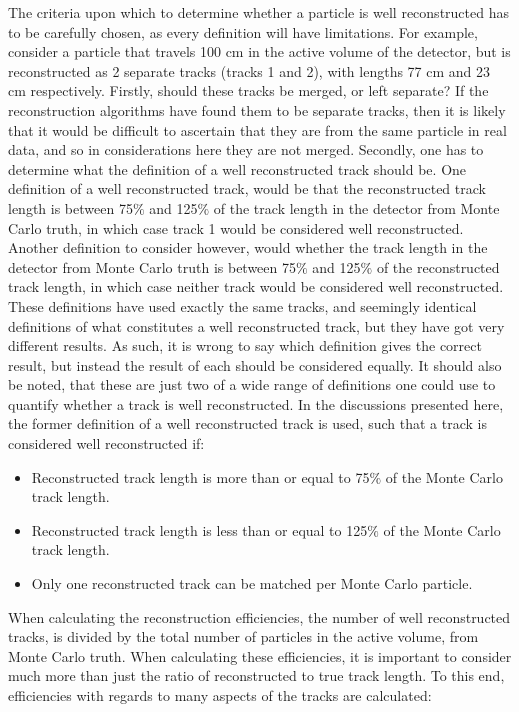 The criteria upon which to determine whether a particle is well reconstructed has to be carefully chosen, as every definition will have limitations. For example, consider a particle that travels 100 cm in the active volume of the detector, but is reconstructed as 2 separate tracks (tracks 1 and 2), with lengths 77 cm and 23 cm respectively. Firstly, should these tracks be merged, or left separate? If the reconstruction algorithms have found them to be separate tracks, then it is likely that it would be difficult to ascertain that they are from the same particle in real data, and so in considerations here they are not merged. Secondly, one has to determine what the definition of a well reconstructed track should be. One definition of a well reconstructed track, would be that the reconstructed track length is between 75$\%$ and 125$\%$ of the track length in the detector from Monte Carlo truth, in which case track 1 would be considered well reconstructed. Another definition to consider however, would whether the track length in the detector from Monte Carlo truth is between 75$\%$ and 125$\%$ of the reconstructed track length, in which case neither track would be considered well reconstructed. These definitions have used exactly the same tracks, and seemingly identical definitions of what constitutes a well reconstructed track, but they have got very different results. As such, it is wrong to say which definition gives the correct result, but instead the result of each should be considered equally. It should also be noted, that these are just two of a wide range of definitions one could use to quantify whether a track is well reconstructed. In the discussions presented here, the former definition of a well reconstructed track is used, such that a track is considered well reconstructed if:
\begin{itemize}
\item Reconstructed track length is more than or equal to 75$\%$ of the Monte Carlo track length.
\item Reconstructed track length is less than or equal to 125$\%$ of the Monte Carlo track length.
\item Only one reconstructed track can be matched per Monte Carlo particle.
\end{itemize}
When calculating the reconstruction efficiencies, the number of well reconstructed tracks, is divided by the total number of particles in the active volume, from Monte Carlo truth. When calculating these efficiencies, it is important to consider much more than just the ratio of reconstructed to true track length. To this end, efficiencies with regards to many aspects of the tracks are calculated:
